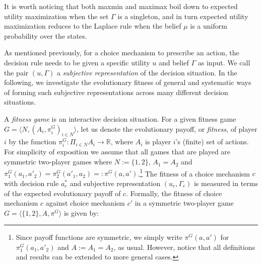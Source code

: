 \documentclass[fleqn,reqno,12pt]{article}
\theoremstyle{Satz}
\theoremstyle{Bsp}
\begin{document}
It is worth noticing that both maxmin and maximax boil down to expected utility maximization
when the set $\Gamma$ is a singleton, and in turn expected utility maximization reduces to the
Laplace rule when the belief $\mu$ is a uniform probability over the states.

As mentioned previously, for a choice mechanism to prescribe an action, the decision rule needs
to be given a specific utility $u$ and belief $\Gamma$ as input. We call the pair $(u,\Gamma)$
a \textit{subjective representation} of the decision situation. In the following, we investigate
the evolutionary fitness of general and systematic ways of forming such subjective
representations across many different decision situations.


A \emph{fitness game} is an interactive decision situation.  For a given fitness game
$G=\langle N, (A_i,\pi^G_i)_{i \in N} \rangle$, let us denote the evolutionary payoff, or
\textit{fitness}, of player $i$ by the function
$\pi^G_i: \Pi_{i \in N} A_i \rightarrow \mathbb{R}$, where $A_i$ is player $i$'s (finite) set
of actions. For simplicity of exposition we assume that all games that are played are symmetric
two-player games where $N:=\{1,2\}$, $A_1 = A_2 $ and
$\pi^G_1(a_1, a'_2)= \pi^G_2(a'_1, a_2)=:\pi^G(a,a')$.\footnote{Since payoff functions are
  symmetric, we simply write $\pi^G(a, a')$ for $\pi^G_1(a_1, a'_2)$ and $A:=A_1=A_2$, as
  usual. However, notice that all definitions and results can be extended to more general
  cases.} The fitness of a choice mechanism $c$ with decision rule $a_{c}^{*}$ and subjective representation $(u_c,\Gamma_c)$ is
measured in terms of the expected evolutionary payoff of $c$.
Formally, the fitness of choice mechanism $c$ against choice mechanism $c'$ in a
symmetric two-player game $G=\langle \{1,2\}, A, \pi^G \rangle$ is given by:
\end{document}
